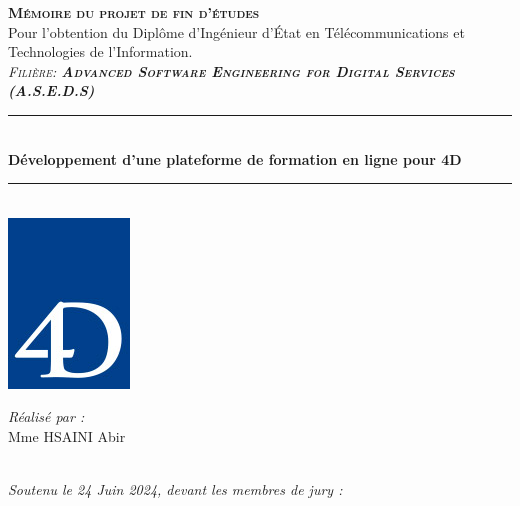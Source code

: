 \vspace{0.5cm}
\begin{center}
{\large \textsc{\textbf{Mémoire du projet de fin d'études}}}\\[0.1cm]
{\large {Pour l’obtention du Diplôme d’Ingénieur d’État en Télécommunications et Technologies de l’Information.}}\\[0.1cm]
{\large \textsc{\textit{Filière:\textbf{ Advanced Software Engineering for Digital Services (A.S.E.D.S)}}}} \\[0.05cm] 
\vspace{-0.04cm}
\rule{\linewidth}{0.3mm} \\[0.4cm]   %
 { \huge \textbf{ Développement d’une plateforme de formation en ligne pour 4D }} \\[0.15cm] 
\rule{\linewidth}{0.3mm} \\[0.4cm]


\includegraphics[scale=0.38]{Logos/Logo-4D.jpg}  %

\vspace{1cm}

\noindent
\begin{minipage}{0.9\textwidth}
    \vspace{-7mm}
  \begin{flushleft} \large
    \emph{Réalisé par :}\\
    Mme \textsc{HSAINI} Abir %
  \end{flushleft}
\end{minipage}
\begin{minipage}{0.4\textwidth}

\end{minipage}\\[0.4cm]

{\large \textit{Soutenu le 24 Juin 2024, devant les membres de jury : }}\\[0.3cm]



\end{center}
